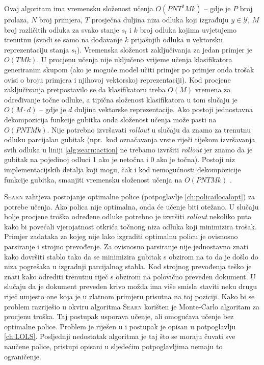 Ovaj algoritam ima vremensku složenost učenja $O(P N T^2 M k)$ -- gdje je $P$
broj prolaza, $N$ broj primjera, $T$ prosječna duljina niza odluka koji
izgrađuju $y \in \mathcal{Y}$, $M$ broj različitih odluka za svako stanje $s_t$
i $k$ broj odluka kojima uvjetujemo trenutnu (svodi se samo na dodavanje $k$
prijašnjih odluka u vektorsku reprezentaciju stanja $s_t$). Vremenska složenost
zaključivanja za jedan primjer je $O(T M k)$. U procjenu učenja nije uključeno
vrijeme učenja klasifikatora generiranim skupom (ako je moguće model učiti
primjer po primjer  onda trošak ovisi o broju primjera i njihovoj
vektorskoj reprezentaciji). Kod procjene zaključivanja pretpostavilo se da
klasifikatoru treba $O(M)$ vremena za određivanje točne odluke, a tipična
složenost klasifikatora u tom slučaju je $O(M \cdot d)$ -- gdje je $d$ duljina
vektorske reprezentacije. Ako postoji jednostavna dekompozicija funkcije gubitka
onda složenost učenja može pasti na $O(P N T M k)$. Nije potrebno izvršavati
\textit{rollout} u slučaju da znamo za trenutnu odluku parcijalan gubitak
(npr.~kod označavanja vrste riječi tijekom izvršavanja svih odluka u liniji
\ref{alg:searn:action} ne trebamo izvršiti \textit{rollout} jer znamo da je
gubitak na pojedinoj odluci 1 ako je netočna i 0 ako je točna). Postoji niz
implementacijskih detalja koji mogu, čak i kod nemogućnosti dekompozicije
funkcije gubitka, smanjiti vremensku složenost učenja na $O(P N T M k)$
\citep{daume14lts}.

\textsc{Searn} zahtjeva postojanje optimalne police (potpoglavlje
\ref{ch:policailocalopt}) za potrebe učenja. Ako polica nije optimalna, onda će
učenje biti otežano. U slučaju bolje procjene troška određene odluke potrebno je
izvršiti \textit{rollout} nekoliko puta kako bi povećali vjerojatnost otkrića
točnong niza odluka koji minimizira trošak. Primjer zadataka za kojeg nije lako
izgraditi optimalnu policu je ovisnosno parsiranje i strojno prevođenje. Za
ovisnosno parsiranje nije jednostavno znati kako dovršiti stablo tako da se
minimizira gubitak s obzirom na to da je došlo do niza pogrešaka u izgradnji
parcijalnog stabla. Kod strojnog prevođenja teško je znati kako odrediti
trenutnu riječ s obzirom na polovično preveden dokument. U slučaju da je
dokument preveden krivo možda ima više smisla staviti neku drugu riječ umjesto
one koja je u zlatnom primjeru prisutna na toj poziciji. Kako bi se problem
razriješio u okviru algoritma \textsc{Searn} korišten je Monte-Carlo algoritam
za procjenu troška. Taj postupak usporava učenje, ali omogućava učenje bez
optimalne police. Problem je riješen u \citep{daume15lols} i postupak je opisan
u potpoglavlju \ref{ch:LOLS}. Posljednji nedostatak algoritma je taj što se
moraju čuvati sve naučene police, pristupi opisani u sljedećim potpoglavljima
nemaju to ograničenje.

